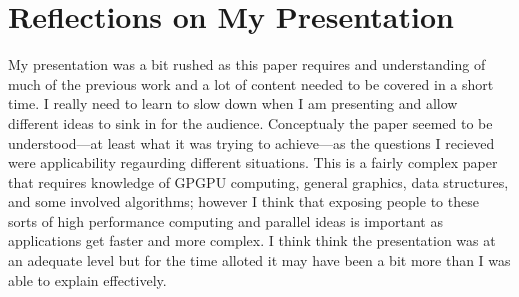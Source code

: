 \documentclass[10pt, twocolumn]{article}
\begin{document}
\section{Reflections on My Presentation}
My presentation was a bit rushed as this paper requires and understanding of
much of the previous work and a lot of content needed to be covered in a short
time. 
I really need to learn to slow down when I am presenting and allow different ideas to
sink in for the audience. Conceptualy the paper seemed to be understood---at
least what it was trying to achieve---as the questions I recieved were
applicability regaurding different situations. This is a fairly complex paper that
requires knowledge of GPGPU computing, general graphics, data structures, and
some involved algorithms; however I think that exposing people to these sorts of
high performance computing and parallel ideas is important as applications get
faster and more complex. I think think the presentation was at an adequate level
but for the time alloted it may have been a bit more than I was able to explain
effectively. 





\end{document}
